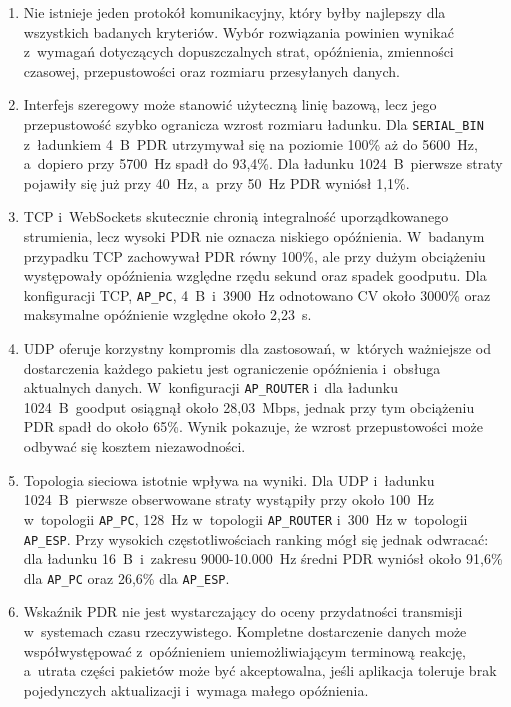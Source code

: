 \begin{enumerate}
    \item Nie istnieje jeden protokół komunikacyjny, który byłby najlepszy dla wszystkich badanych kryteriów.
          Wybór rozwiązania powinien wynikać z~wymagań dotyczących dopuszczalnych strat, opóźnienia, zmienności czasowej, przepustowości oraz rozmiaru przesyłanych danych.

    \item Interfejs szeregowy może stanowić użyteczną linię bazową, lecz jego przepustowość szybko ogranicza wzrost rozmiaru ładunku.
          Dla \texttt{SERIAL\_BIN} z~ładunkiem 4~B~PDR utrzymywał się na poziomie 100\% aż do 5600~Hz, a~dopiero przy 5700~Hz spadł do 93,4\%.
          Dla ładunku 1024~B~pierwsze straty pojawiły się już przy 40~Hz, a~przy 50~Hz PDR wyniósł 1,1\%.

    \item TCP i~WebSockets skutecznie chronią integralność uporządkowanego strumienia, lecz wysoki PDR nie oznacza niskiego opóźnienia.
          W~badanym przypadku TCP zachowywał PDR równy 100\%, ale przy dużym obciążeniu występowały opóźnienia względne rzędu sekund oraz spadek goodputu.
          Dla konfiguracji TCP, \texttt{AP\_PC}, 4~B~i~3900~Hz odnotowano CV około 3000\% oraz maksymalne opóźnienie względne około 2,23~s.

    \item UDP oferuje korzystny kompromis dla zastosowań, w~których ważniejsze od dostarczenia każdego pakietu jest ograniczenie opóźnienia i~obsługa aktualnych danych.
          W~konfiguracji \texttt{AP\_ROUTER} i~dla ładunku 1024~B~goodput osiągnął około 28,03~Mbps, jednak przy tym obciążeniu PDR spadł do około 65\%.
          Wynik pokazuje, że wzrost przepustowości może odbywać się kosztem niezawodności.

    \item Topologia sieciowa istotnie wpływa na wyniki.
          Dla UDP i~ładunku 1024~B~pierwsze obserwowane straty wystąpiły przy około 100~Hz w~topologii \texttt{AP\_PC}, 128~Hz w~topologii \texttt{AP\_ROUTER} i~300~Hz w~topologii \texttt{AP\_ESP}.
          Przy wysokich częstotliwościach ranking mógł się jednak odwracać: dla ładunku 16~B~i~zakresu 9000-10.000~Hz średni PDR wyniósł około 91,6\% dla \texttt{AP\_PC} oraz 26,6\% dla \texttt{AP\_ESP}.

    \item Wskaźnik PDR nie jest wystarczający do oceny przydatności transmisji w~systemach czasu rzeczywistego.
          Kompletne dostarczenie danych może współwystępować z~opóźnieniem uniemożliwiającym terminową reakcję, a~utrata części pakietów może być akceptowalna, jeśli aplikacja toleruje brak pojedynczych aktualizacji i~wymaga małego opóźnienia.
\end{enumerate}

